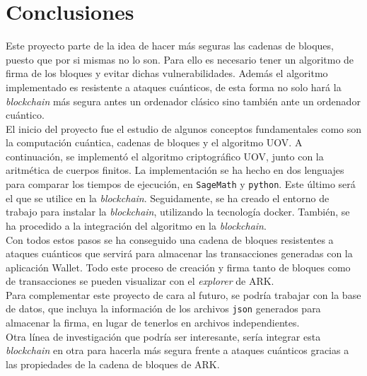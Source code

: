\chapter{Conclusiones}

Este proyecto parte de la idea de hacer más seguras las cadenas de bloques, puesto que por si mismas no lo son. Para ello es necesario tener un algoritmo de firma de los bloques y evitar dichas vulnerabilidades. Además el algoritmo implementado es resistente a ataques cuánticos, de esta forma no solo hará la \textit{blockchain} más segura antes un ordenador clásico sino también ante un ordenador cuántico.\\

El inicio del proyecto fue el estudio de algunos conceptos fundamentales como son la computación cuántica, cadenas de bloques y el algoritmo UOV. A continuación, se implementó el algoritmo criptográfico UOV, junto con la aritmética de cuerpos finitos. La implementación se ha hecho en dos lenguajes para comparar los tiempos de ejecución, en \texttt{SageMath} y \texttt{python}. Este último será el que se utilice en la \textit{blockchain}. Seguidamente, se ha creado el entorno de trabajo para instalar la \textit{blockchain}, utilizando la tecnología docker. También, se ha procedido a la integración del algoritmo en la \textit{blockchain}.\\

Con todos estos pasos se ha conseguido una cadena de bloques resistentes a ataques cuánticos que servirá para almacenar las transacciones generadas con la aplicación Wallet. Todo este proceso de creación y firma tanto de bloques como de transacciones se pueden visualizar con el \textit{explorer} de ARK.\\


Para complementar este proyecto de cara al futuro, se podría trabajar con la base de datos, que incluya la información de los archivos \texttt{json} generados para almacenar la firma, en lugar de tenerlos en archivos independientes.\\

Otra línea de investigación que podría ser interesante, sería integrar esta \textit{blockchain} en otra para hacerla más segura frente a ataques cuánticos gracias a las propiedades de la cadena de bloques de ARK.\\

